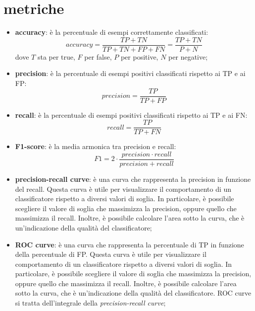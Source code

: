 \documentclass{article}
\begin{document}
\section{metriche}
\begin{itemize}
	\item \textbf{accuracy}: è la percentuale di esempi correttamente
		classificati:
		\begin{equation}
			accuracy = \frac{TP + TN}{TP + TN + FP + FN} = \frac{TP + TN}{P + N}
		\end{equation}
		dove $T$ sta per true, $F$ per false, $P$ per positive, $N$ per 
		negative;

	\item \textbf{precision}: è la percentuale di esempi positivi classificati
		rispetto ai TP e ai FP:
		\begin{equation}
			precision = \frac{TP}{TP + FP}
		\end{equation}

	\item \textbf{recall}: è la percentuale di esempi positivi classificati
		rispetto ai TP e ai FN:
		\begin{equation}
			recall = \frac{TP}{TP + FN}
		\end{equation}

	\item \textbf{F1-score}: è la media armonica tra precision e recall:
		\begin{equation}
			F1 = 2 \cdot \frac{precision \cdot recall}{precision + recall}
		\end{equation}

	\item \textbf{precision-recall curve}: è una curva che rappresenta la
		precision in funzione del recall. Questa curva è utile per
		visualizzare il comportamento di un classificatore rispetto a
		diversi valori di soglia. In particolare, è possibile scegliere il
		valore di soglia che massimizza la precision, oppure quello che
		massimizza il recall. Inoltre, è possibile calcolare l'area sotto la
		curva, che è un'indicazione della qualità del classificatore;

	\item \textbf{ROC curve}: è una curva che rappresenta la percentuale di
		TP in funzione della percentuale di FP. Questa curva è utile per
		visualizzare il comportamento di un classificatore rispetto a
		diversi valori di soglia. In particolare, è possibile scegliere il
		valore di soglia che massimizza la precision, oppure quello che
		massimizza il recall. Inoltre, è possibile calcolare l'area sotto la
		curva, che è un'indicazione della qualità del classificatore. ROC curve
		si tratta dell'integrale della \textit{precision-recall curve};


\end{itemize}
\end{document}
